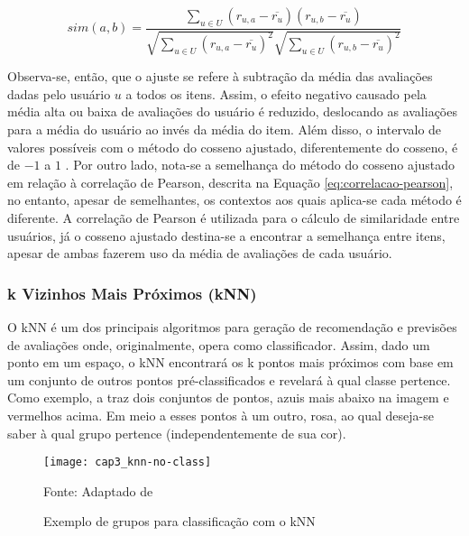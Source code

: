         \begin{equation}
             sim(a, b) = \frac{\sum_{u\in U}(r_{u, a}-\overline{r_u})(r_{u, b}-\overline{r_u})}{\sqrt{\sum_{u\in U}(r_{u, a}-\overline{r_u})^2}\sqrt{\sum_{u\in U}(r_{u, b}-\overline{r_u})^2}} \label{eq:sim-cosseno-ajustado}
        \end{equation}
        
        Observa-se, então, que o ajuste se refere à subtração da média das avaliações dadas pelo usuário $u$ a todos os itens. Assim, o efeito negativo causado pela média alta ou baixa de avaliações do usuário é reduzido, deslocando as avaliações para a média do usuário ao invés da média do item. Além disso, o intervalo de valores possíveis com o método do cosseno ajustado, diferentemente do cosseno, é de $-1$ a $1$ \cite{Jannach2010, Ricci2010}. Por outro lado, nota-se a semelhança do método do cosseno ajustado em relação à correlação de Pearson, descrita na Equação \ref{eq:correlacao-pearson}, no entanto, apesar de semelhantes, os contextos aos quais aplica-se cada método é diferente. A correlação de Pearson é utilizada para o cálculo de similaridade entre usuários, já o cosseno ajustado destina-se a encontrar a semelhança entre itens, apesar de ambas fazerem uso da média de avaliações de cada usuário.
        
        \subsubsection{k Vizinhos Mais Próximos (kNN)}
            
            O kNN é um dos principais algoritmos para geração de recomendação e previsões de avaliações \cite{Bobadilla_2013} onde, originalmente, opera como classificador. Assim, dado um ponto em um espaço, o kNN encontrará os k pontos mais próximos com base em um conjunto de outros pontos pré-classificados e revelará à qual classe pertence. Como exemplo, a  traz dois conjuntos de pontos, azuis mais abaixo na imagem e vermelhos acima. Em meio a esses pontos à um outro, rosa, ao qual deseja-se saber à qual grupo pertence (independentemente de sua cor).             
            
            \begin{figure}[htb]
                \caption{Exemplo de grupos para classificação com o kNN}
                \texttt{[image: cap3\_knn-no-class]}
                \label{fig:cap3_knn-no-class}
                
                {\footnotesize Fonte: Adaptado de }
            \end{figure}
                        
